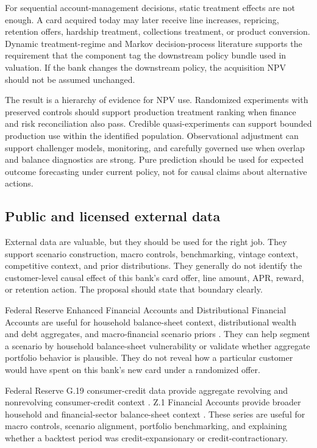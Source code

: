 \documentclass[11pt]{article}
\newcommand{\1}{\mathbf{1}}
\begin{document}
For sequential account-management decisions, static treatment effects are not
enough. A card acquired today may later receive line increases, repricing,
retention offers, hardship treatment, collections treatment, or product
conversion. Dynamic treatment-regime and Markov decision-process literature
\citep{murphy2003dynamic,puterman1994mdp} supports the requirement that the
component tag the downstream policy bundle used in valuation. If the bank
changes the downstream policy, the acquisition NPV should not be assumed
unchanged.

The result is a hierarchy of evidence for NPV use. Randomized experiments with
preserved controls should support production treatment ranking when finance
and risk reconciliation also pass. Credible quasi-experiments can support
bounded production use within the identified population. Observational
adjustment can support challenger models, monitoring, and carefully governed
use when overlap and balance diagnostics are strong. Pure prediction should be
used for expected outcome forecasting under current policy, not for causal
claims about alternative actions.

\subsection{Public and licensed external data}

External data are valuable, but they should be used for the right job. They
support scenario construction, macro controls, benchmarking, vintage context,
competitive context, and prior distributions. They generally do not identify
the customer-level causal effect of this bank's card offer, line amount, APR,
reward, or retention action. The proposal should state that boundary clearly.

Federal Reserve Enhanced Financial Accounts and Distributional Financial
Accounts are useful for household balance-sheet context, distributional wealth
and debt aggregates, and macro-financial scenario priors
\citep{federalreserveEFA}. They can help segment a scenario by household
balance-sheet vulnerability or validate whether aggregate portfolio behavior is
plausible. They do not reveal how a particular customer would have spent on
this bank's new card under a randomized offer.

Federal Reserve G.19 consumer-credit data provide aggregate revolving and
nonrevolving consumer-credit context \citep{federalreserveG19}. Z.1 Financial
Accounts provide broader household and financial-sector balance-sheet context
\citep{federalreserveZ1}. These series are useful for macro controls, scenario
alignment, portfolio benchmarking, and explaining whether a backtest period was
credit-expansionary or credit-contractionary.
\end{document}
